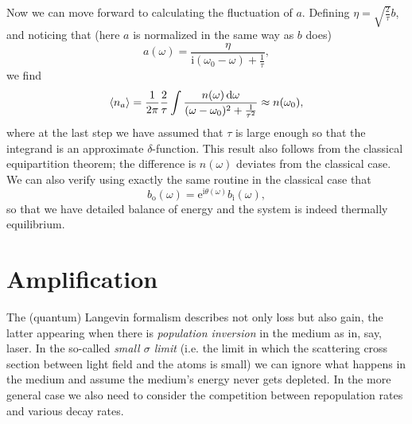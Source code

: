 \documentclass[hyperref, a4paper]{article}
\newcommand*{\ii}{\mathrm{i}}
\newcommand*{\ee}{\mathrm{e}}
\newcommand*{\bi}{b_{\text{i}}}
\newcommand*{\bo}{b_{\text{o}}}
\begin{document}
Now we can move forward to calculating the fluctuation of $a$.
Defining $\eta = \sqrt{\frac{2}{\tau}} b$,
and noticing that (here $a$ is normalized in the same way as $b$ does)
\begin{equation}
    a(\omega) = \frac{\eta}{\ii(\omega_0 - \omega) + \frac{1}{\tau}},
\end{equation}
we find 
\begin{equation}
    \expval{n_a} = \frac{1}{2\pi} \frac{2}{\tau} \int \frac{n(\omega) \dd{\omega}}{(\omega - \omega_0)^2 + \frac{1}{\tau^2}} \approx 
    n(\omega_0),
\end{equation}
where at the last step we have assumed that $\tau$ is large enough so that the integrand is an approximate $\delta$-function.
This result also follows from the classical equipartition theorem;
the difference is $n(\omega)$ deviates from the classical case.
We can also verify using exactly the same routine in the classical case that 
\begin{equation}
    \bo(\omega) = \ee^{\ii \theta(\omega)} \bi(\omega),
\end{equation}
so that we have detailed balance of energy and the system is indeed thermally equilibrium.

\section{Amplification}

The (quantum) Langevin formalism describes not only loss but also gain,
the latter appearing when there is \emph{population inversion} in the medium as in, say, laser.
In the so-called \emph{small $\sigma$ limit} 
(i.e. the limit in which the scattering cross section between light field and the atoms is small)
we can ignore what happens in the medium and assume the medium's energy never gets depleted.
In the more general case we also need to consider the competition 
between repopulation rates and various decay rates.
\end{document}
